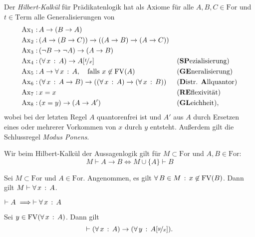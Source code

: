 \documentclass{cheat-sheet}
\newcommand{\Term}{\mathrm{Term}} %
\newcommand{\For}{\mathrm{For}} %
\newcommand{\Ax}{\mathrm{Ax}} %
\newcommand{\FV}{\mathrm{FV}} %
\newcommand{\subst}[2]{\nicefrac{#1}{#2}} %
\begin{document}
\begin{defn}
  Der \emph{Hilbert-Kalkül} für Prädikatenlogik hat als Axiome für alle $A, B, C \in \For$ und $t \in \Term$ alle Generalisierungen von
  \begin{alignat*}{3}
    \Ax_1 :\, & A \to (B \to A) && \\
    \Ax_2 :\, & (A \to (B \to C)) \to ((A \to B) \to (A \to C)) && \\
    \Ax_3 :\, & (\neg B \to \neg A) \to (A \to B) && \\
    \Ax_4 :\, & (\fa{x} A) \to A[\subst{t}{x}] && \text{(\textbf{SP}ezialisierung)} \\
    \Ax_5 :\, & A \to \fa{x} A, \quad \text{falls $x \not\in \FV(A)$} && \text{(\textbf{GE}neralisierung)} \\
    \Ax_6 :\, & (\fa{x} A \to B) \to ((\fa{x} A) \to (\fa{x} B)) \enspace && \text{(\textbf{D}istr. \textbf{A}llquantor)} \\
    \Ax_7 :\, & x = x && \text{(\textbf{RE}flexivität)} \\
    \Ax_8 :\, & (x = y) \to (A \to A') && \text{(\textbf{GL}eichheit)},
  \end{alignat*}
  wobei bei der letzten Regel $A$ quantorenfrei ist und $A'$ aus $A$ durch Ersetzen eines oder mehrerer Vorkommen von $x$ durch $y$ entsteht. Außerdem gilt die Schlussregel \emph{Modus Ponens}.
\end{defn}


\begin{satz}[Deduktionstheorem]
  Wir beim Hilbert-Kalkül der Aussagenlogik gilt für $M \subset \For$ und $A, B \in \For$:
  \[ M \vdash A \to B \iff M \cup \{ A \} \vdash B \]
\end{satz}

\begin{satz}[Generalisierungstheorem]
  Sei $M \subset \For$ und $A \in \For$. Angenommen, es gilt $\fa{B \in M} x \not\in \FV(B)$. Dann gilt $M \vdash \forall \, {x} \,:\, A$.
\end{satz}

\begin{kor}
  $\vdash A \implies \vdash \forall \, {x} \,:\, A$
\end{kor}

\begin{prop}
  Sei $y \in \FV(\fa{x} A)$. Dann gilt
  \[ \vdash (\fa{x} A) \to (\fa{y} A[\subst{y}{x}]). \]
\end{prop}
\end{document}
